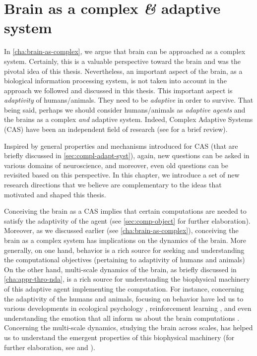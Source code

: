\chapter{Brain as a complex \emph{\&} adaptive system}\label{cha:brain-as-complex-adaptive}
In \autoref{cha:brain-as-complex}, we argue that brain can be approached as a complex system.
Certainly, this is a valuable perspective toward the brain and was the pivotal idea of this thesis.
Nevertheless, an important aspect of the brain, as a biological information processing system,
is not taken into account in the approach we followed and discussed in this thesis.
This important aspect is \emph{adaptivity} of humans/animals.
They need to be \emph{adaptive} in order to survive.
That being said, perhaps we should consider humans/animals as \emph{adaptive agents} and the brains as a complex \emph{and} adaptive system.
Indeed, Complex Adaptive Systems (CAS) have been an independent field of research 
(see  for a brief review).



Inspired by general properties and mechanisms introduced for CAS
(that are briefly discussed in \autoref{sec:compl-adapt-syst}), 
again, new questions can be asked in various domains of neuroscience, 
and moreover, even old questions can be revisited based on this perspective.
In this chapter, we introduce a set of new research directions that we believe are complementary to the ideas that motivated and shaped this thesis.

Conceiving the brain as a CAS implies that certain computations are needed to satisfy the adaptivity of the agent (see \autoref{sec:comp-object} for further elaboration).
Moreover, as we discussed earlier (see \autoref{cha:brain-as-complex}),
conceiving the brain as a complex system has implications on the dynamics of the brain.
%
More generally, on one hand, behavior is a rich source for seeking and understanding the computational objectives
(pertaining to adaptivity of humans and animals)
% 
% 
On the other hand, multi-scale dynamics of the brain, as briefly discussed in \autoref{cha:appr-thro-nda},
is a rich source for understanding the biophysical machinery of this adaptive agent implementing the computation.
% 
For instance, concerning the adaptivity of the humans and animals, focusing on behavior have led us to various developments in
ecological psychology \cite{reedEncounteringWorldEcological1996},
reinforcement learning \cite{nivReinforcementLearningBrain2009},
and even understanding the emotion \cite{bachAlgorithmsSurvivalComparative2017}
that all inform us about the brain computations \cite{nivPrimacyBehavioralResearch2020}. 
Concerning the multi-scale dynamics,
studying the brain across scales,
has helped us to understand the emergent properties of this biophysical machinery
(for further elaboration, see \citet[Chapter 1]{pesensonMultiscaleAnalysisNonlinear2013} and \citet{siettosMultiscaleModelingBrain2016}).

